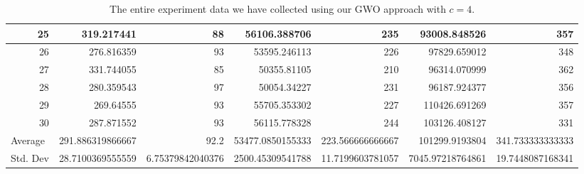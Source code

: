 \begin{table}
\begin{adjustwidth}{}{}
{{\begin{tabular}{|r|r|r|r|r|r|r|}
\hline
25                                         & 319.217441                   & 88                                    & 56106.388706                   & 235                                   & 93008.848526                 & 357                                    \\ 
\hline
26                                         & 276.816359                   & 93                                    & 53595.246113                   & 226                                   & 97829.659012                 & 348                                    \\ 
\hline
27                                         & 331.744055                   & 85                                    & 50355.81105                    & 210                                   & 96314.070999                 & 362                                    \\ 
\hline
28                                         & 280.359543                   & 97                                    & 50054.34227                    & 231                                   & 96187.924377                 & 356                                    \\ 
\hline
29                                         & 269.64555                    & 93                                    & 55705.353302                   & 227                                   & 110426.691269                & 357                                    \\ 
\hline
30                                         & 287.871552                   & 93                                    & 56115.778328                   & 244                                   & 103126.408127                & 331                                    \\ 
\hline
\multicolumn{1}{|l|}{Average}              & 291.886319866667             & 92.2                                  & 53477.0850155333               & 223.566666666667                      & 101299.9193804               & 341.733333333333                       \\ 
\hline
\multicolumn{1}{|l|}{Std. Dev}             & 28.7100369555559             & 6.75379842040376                      & 2500.45309541788               & 11.7199603781057                      & 7045.97218764861             & 19.7448087168341                       \\
\hline
\end{tabular}}}
\end{adjustwidth}
\caption{The entire experiment data we have collected using our GWO approach with $c = 4$.}
\label{full-data-gwo-c4}
\end{table}

